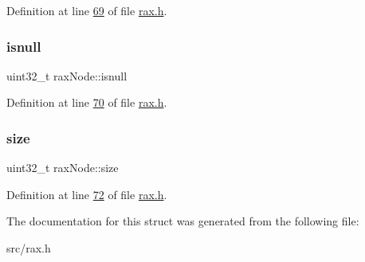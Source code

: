 Definition at line \hyperlink{rax_8h_source_l00069}{69} of file \hyperlink{rax_8h_source}{rax.\+h}.

\mbox{\label{structraxNode_a4547d7b800bc1dac851b451547fec124}} 
\subsubsection{\texorpdfstring{isnull}{isnull}}
{\footnotesize\ttfamily uint32\+\_\+t rax\+Node\+::isnull}



Definition at line \hyperlink{rax_8h_source_l00070}{70} of file \hyperlink{rax_8h_source}{rax.\+h}.

\mbox{\label{structraxNode_a117110a25eb5d984b5b6a470eb25222c}} 
\subsubsection{\texorpdfstring{size}{size}}
{\footnotesize\ttfamily uint32\+\_\+t rax\+Node\+::size}



Definition at line \hyperlink{rax_8h_source_l00072}{72} of file \hyperlink{rax_8h_source}{rax.\+h}.



The documentation for this struct was generated from the following file\+:\begin{DoxyCompactItemize}
\item 
src/rax.\+h\end{DoxyCompactItemize}
